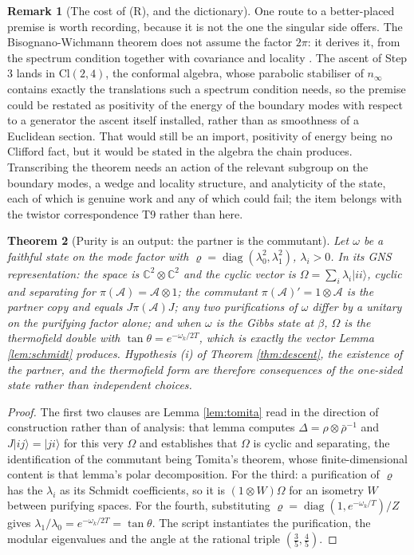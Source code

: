 \documentclass[11pt]{article}
\newtheorem{theorem}{Theorem}[section]
\theoremstyle{definition}
\newtheorem{remark}[theorem]{Remark}
\newcommand{\Cl}{\mathrm{Cl}}
\newcommand{\C}{\mathbb{C}}
\newcommand{\nInf}{n_\infty}
\newcommand{\Aa}{\mathcal{A}}
\begin{document}
\begin{remark}[The cost of (R), and the dictionary]
One route to a better-placed premise is worth recording, because it is not the one the singular side offers. The Bisognano-Wichmann theorem does not assume the factor $2\pi$: it derives it, from the spectrum condition together with covariance and locality \cite{BW1976, Sewell1982}. The ascent of Step 3 lands in $\Cl(2,4)$, the conformal algebra, whose parabolic stabiliser of $\nInf$ contains exactly the translations such a spectrum condition needs, so the premise could be restated as positivity of the energy of the boundary modes with respect to a generator the ascent itself installed, rather than as smoothness of a Euclidean section. That would still be an import, positivity of energy being no Clifford fact, but it would be stated in the algebra the chain produces. Transcribing the theorem needs an action of the relevant subgroup on the boundary modes, a wedge and locality structure, and analyticity of the state, each of which is genuine work and any of which could fail; the item belongs with the twistor correspondence T9 \cite{ButlerT9} rather than here.
\end{remark}

\begin{theorem}[Purity is an output: the partner is the commutant]\label{thm:gns}
Let $\omega$ be a faithful state on the mode factor with $\varrho = \operatorname{diag}(\lambda_0^{2}, \lambda_1^{2})$, $\lambda_i > 0$. In its GNS representation: the space is $\C^{2}\otimes\C^{2}$ and the cyclic vector is $\Omega = \sum_i \lambda_i|ii\rangle$, cyclic and separating for $\pi(\Aa) = \Aa\otimes 1$; the commutant $\pi(\Aa)' = 1 \otimes \Aa$ is the partner copy and equals $J\pi(\Aa)J$; any two purifications of $\omega$ differ by a unitary on the purifying factor alone; and when $\omega$ is the Gibbs state at $\beta$, $\Omega$ is the thermofield double with $\tan\theta = e^{-\omega_k/2T}$, which is exactly the vector Lemma \ref{lem:schmidt} produces. Hypothesis (i) of Theorem \ref{thm:descent}, the existence of the partner, and the thermofield form are therefore consequences of the one-sided state rather than independent choices.
\end{theorem}

\begin{proof}
The first two clauses are Lemma \ref{lem:tomita} read in the direction of construction rather than of analysis: that lemma computes $\Delta = \rho\otimes\bar\rho^{-1}$ and $J|ij\rangle = |ji\rangle$ for this very $\Omega$ and establishes that $\Omega$ is cyclic and separating, the identification of the commutant being Tomita's theorem, whose finite-dimensional content is that lemma's polar decomposition. For the third: a purification of $\varrho$ has the $\lambda_i$ as its Schmidt coefficients, so it is $(1\otimes W)\Omega$ for an isometry $W$ between purifying spaces. For the fourth, substituting $\varrho = \operatorname{diag}(1, e^{-\omega_k/T})/Z$ gives $\lambda_1/\lambda_0 = e^{-\omega_k/2T} = \tan\theta$. The script instantiates the purification, the modular eigenvalues and the angle at the rational triple $(\tfrac35, \tfrac45)$.
\end{proof}
\end{document}
